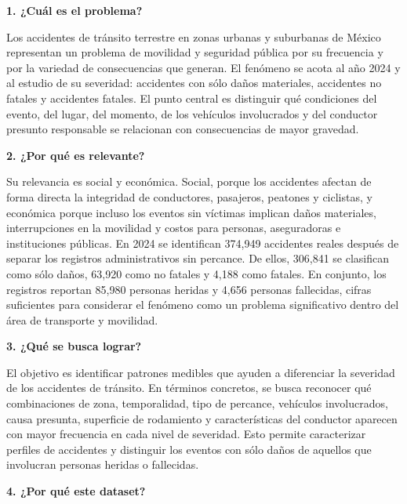 \documentclass[11pt,letterpaper]{article}
\begin{document}
\begin{nota}

\vspace{0.45em}
\textbf{1. ¿Cuál es el problema?}

Los accidentes de tránsito terrestre en zonas urbanas y suburbanas de México
representan un problema de movilidad y seguridad pública por su frecuencia y por
la variedad de consecuencias que generan. El fenómeno se acota al año 2024 y al
estudio de su severidad: accidentes con sólo daños materiales, accidentes no
fatales y accidentes fatales. El punto central es distinguir qué condiciones del
evento, del lugar, del momento, de los vehículos involucrados y del conductor
presunto responsable se relacionan con consecuencias de mayor gravedad.

\vspace{0.6em}
\textbf{2. ¿Por qué es relevante?}

Su relevancia es social y económica. Social, porque los accidentes afectan de
forma directa la integridad de conductores, pasajeros, peatones y ciclistas, y 
económica porque incluso los eventos sin víctimas implican daños materiales,
interrupciones en la movilidad y costos para personas, aseguradoras e
instituciones públicas. En 2024 se identifican 374,949 accidentes reales después
de separar los registros administrativos sin percance. De ellos, 306,841 se
clasifican como sólo daños, 63,920 como no fatales y 4,188 como fatales. En
conjunto, los registros reportan 85,980 personas heridas y 4,656 personas
fallecidas, cifras suficientes para considerar el fenómeno como un problema
significativo dentro del área de transporte y movilidad.

\vspace{0.6em}
\textbf{3. ¿Qué se busca lograr?}

El objetivo es identificar patrones medibles que ayuden a diferenciar la
severidad de los accidentes de tránsito. En términos concretos, se busca
reconocer qué combinaciones de zona, temporalidad, tipo de percance, vehículos
involucrados, causa presunta, superficie de rodamiento y características del
conductor aparecen con mayor frecuencia en cada nivel de severidad. Esto permite
caracterizar perfiles de accidentes y distinguir los eventos con sólo daños de
aquellos que involucran personas heridas o fallecidas.

\vspace{0.6em}
\textbf{4. ¿Por qué este dataset?}


\end{nota}
\end{document}
